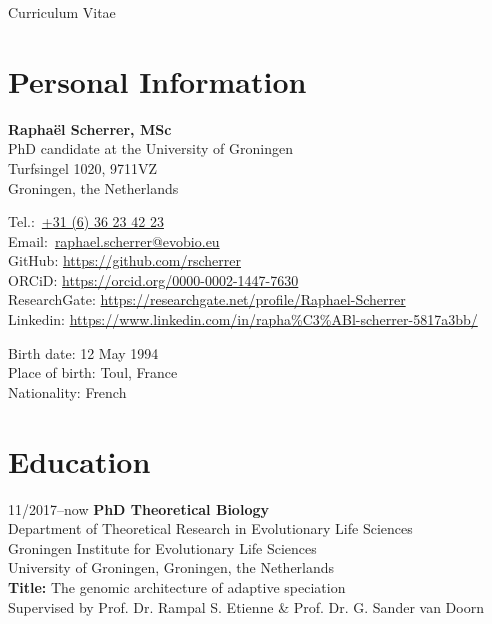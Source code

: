 \documentclass[11pt,a4paper]{article}
\newcommand\phone[1]{\href{tel:#1}{{\emailfont #1}}}
\newcommand\email[1]{\href{mailto:#1}{{\emailfont #1}}}
\newcommand\emailfont{\sffamily}
\newcommand{\CVAuthor}{\textbf{Rapha\"{e}l Scherrer, MSc}}
\begin{document}
	\begin{cv}{Curriculum Vitae}
		
		\section{Personal Information}
		
		\begin{cvlist}{}
			
			\item \CVAuthor\\
			PhD candidate at the University of Groningen\\
			Turfsingel 1020, 9711VZ\\
			Groningen, the Netherlands
			
			\item 
			Tel.:~\phone{+31 (6) 36 23 42 23}\\
			Email:~\email{raphael.scherrer@evobio.eu}\\
			GitHub: \url{https://github.com/rscherrer}\\
			ORCiD: \url{https://orcid.org/0000-0002-1447-7630}\\
			ResearchGate: \url{https://researchgate.net/profile/Raphael-Scherrer}\\
			Linkedin: \url{https://www.linkedin.com/in/rapha%C3%ABl-scherrer-5817a3bb/}
			
			\item 
			Birth date: 12 May 1994\\
			Place of birth: Toul, France\\
			Nationality: French
			
		\end{cvlist}
		
		\section{Education}
		\begin{cvlist}{}
			
			\item[11/2017--now] 
			\textbf{PhD Theoretical Biology}\\ 
			Department of Theoretical Research in Evolutionary Life Sciences\\
			Groningen Institute for Evolutionary Life Sciences\\
			University of Groningen, Groningen, the Netherlands\\
			\textbf{Title:} 
			The genomic architecture of adaptive speciation\\
			Supervised by Prof. Dr. Rampal S. Etienne \& Prof. Dr. G. Sander van Doorn
			

\end{cvlist}
\end{cv}
\end{document}
